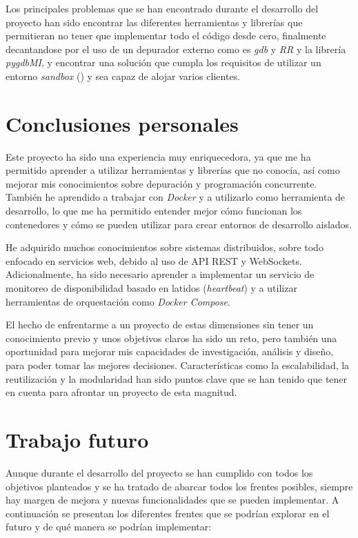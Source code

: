 Los principales problemas que se han encontrado durante el desarrollo del proyecto han sido encontrar las diferentes herramientas y librerías que permitieran no tener que implementar todo el código desde cero, finalmente decantandose por el uso de un depurador externo como es \textit{gdb} y \textit{RR} y la librería \textit{pygdbMI}, y encontrar una solución que cumpla los requisitos de utilizar un entorno \textit{sandbox} () y sea capaz de alojar varios clientes.

\section{Conclusiones personales}\label{sec:conclusiones_personales}

Este proyecto ha sido una experiencia muy enriquecedora, ya que me ha permitido aprender a utilizar herramientas y librerías que no conocía, así como mejorar mis conocimientos sobre depuración y programación concurrente. También he aprendido a trabajar con \textit{Docker} y a utilizarlo como herramienta de desarrollo, lo que me ha permitido entender mejor cómo funcionan los contenedores y cómo se pueden utilizar para crear entornos de desarrollo aislados.

He adquirido muchos conocimientos sobre sistemas distribuidos, sobre todo enfocado en servicios web, debido al uso de API REST y WebSockets. Adicionalmente, ha sido necesario aprender a implementar un servicio de monitoreo de disponibilidad basado en latidos (\textit{heartbeat}) y a utilizar herramientas de orquestación como \textit{Docker Compose}.

El hecho de enfrentarme a un proyecto de estas dimensiones sin tener un conocimiento previo y unos objetivos claros ha sido un reto, pero también una oportunidad para mejorar mis capacidades de investigación, análisis y diseño, para poder tomar las mejores decisiones. Características como la escalabilidad, la reutilización y la modularidad han sido puntos clave que se han tenido que tener en cuenta para afrontar un proyecto de esta magnitud.

\section{Trabajo futuro}\label{sec:trabajo_futuro}

Aunque durante el desarrollo del proyecto se han cumplido con todos los objetivos planteados y se ha tratado de abarcar todos los frentes posibles, siempre hay margen de mejora y nuevas funcionalidades que se pueden implementar. A continuación se presentan los diferentes frentes que se podrían explorar en el futuro y de qué manera se podrían implementar:


